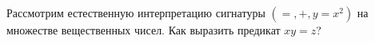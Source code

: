Рассмотрим естественную интерпретацию сигнатуры $(=, +, y = x^2)$ на множестве вещественных чисел. Как выразить предикат
$xy = z$?